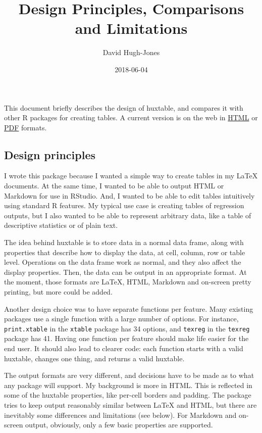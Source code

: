 \documentclass[]{article}
\title{Design Principles, Comparisons and Limitations}
\author{David Hugh-Jones}
\date{2018-06-04}
\begin{document}
\maketitle

This document briefly describes the design of huxtable, and compares it
with other R packages for creating tables. A current version is on the
web in
\href{http://hughjonesd.github.io/huxtable/design-principles.html}{HTML}
or
\href{http://hughjonesd.github.io/huxtable/design-principles.pdf}{PDF}
formats.

\hypertarget{design-principles}{%
\subsection{Design principles}\label{design-principles}}

I wrote this package because I wanted a simple way to create tables in
my LaTeX documents. At the same time, I wanted to be able to output HTML
or Markdown for use in RStudio. And, I wanted to be able to edit tables
intuitively using standard R features. My typical use case is creating
tables of regression outputs, but I also wanted to be able to represent
arbitrary data, like a table of descriptive statistics or of plain text.

The idea behind huxtable is to store data in a normal data frame, along
with properties that describe how to display the data, at cell, column,
row or table level. Operations on the data frame work as normal, and
they also affect the display properties. Then, the data can be output in
an appropriate format. At the moment, those formats are LaTeX, HTML,
Markdown and on-screen pretty printing, but more could be added.

Another design choice was to have separate functions per feature. Many
existing packages use a single function with a large number of options.
For instance, \texttt{print.xtable} in the \texttt{xtable} package has
34 options, and \texttt{texreg} in the \texttt{texreg} package has 41.
Having one function per feature should make life easier for the end
user. It should also lead to clearer code: each function starts with a
valid huxtable, changes one thing, and returns a valid huxtable.

The output formats are very different, and decisions have to be made as
to what any package will support. My background is more in HTML. This is
reflected in some of the huxtable properties, like per-cell borders and
padding. The package tries to keep output reasonably similar between
LaTeX and HTML, but there are inevitably some differences and
limitations (see below). For Markdown and on-screen output, obviously,
only a few basic properties are supported.
\end{document}
